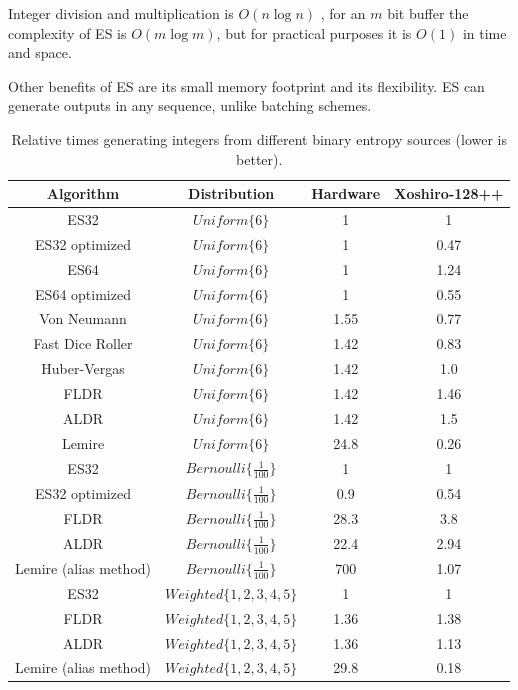 \documentclass[12pt]{article}
\begin{document}
Integer division and multiplication is $O(n \log n)$ \cite{harvey2021integer}, for an $m$ bit buffer the complexity of ES is $O(m \log m)$, but for practical purposes it is $O(1)$ in time and space.

Other benefits of ES are its small memory footprint and its flexibility. ES can generate outputs in any sequence, unlike batching schemes.

\begin{table}[h!]
\centering
\begin{tabular}{|c|c|c|c|}
\hline
Algorithm & Distribution & Hardware & Xoshiro-128++ \\
\hline
ES32                  & $Uniform\{6\}$ & 1 & 1 \\
ES32 optimized        & $Uniform\{6\}$ & 1 & 0.47 \\
ES64                  & $Uniform\{6\}$ & 1 & 1.24 \\
ES64 optimized        & $Uniform\{6\}$ & 1 & 0.55 \\
Von Neumann \cite{neumann51}     & $Uniform\{6\}$ & 1.55 & 0.77 \\
Fast Dice Roller \cite{lumbroso2013optimal} & $Uniform\{6\}$ & 1.42 & 0.83 \\
Huber-Vergas \cite{huber2024optimalrollingfairdice} & $Uniform\{6\}$ & 1.42 & 1.0 \\
FLDR \cite{saad2020fldr} & $Uniform\{6\}$ & 1.42 & 1.46 \\
ALDR \cite{saad2025} & $Uniform\{6\}$ & 1.42 & 1.5 \\
Lemire \cite{lemire2019fast} & $Uniform\{6\}$ & 24.8 & 0.26 \\
\hline

ES32                  & $Bernoulli\{\frac{1}{100}\}$ & 1 & 1 \\
ES32 optimized        & $Bernoulli\{\frac{1}{100}\}$ & 0.9 & 0.54 \\
FLDR                  & $Bernoulli\{\frac{1}{100}\}$ & 28.3 & 3.8 \\
ALDR                  & $Bernoulli\{\frac{1}{100}\}$ & 22.4 & 2.94 \\
Lemire (alias method) & $Bernoulli\{\frac{1}{100}\}$ & 700 & 1.07 \\

\hline

ES32                  & $Weighted\{1,2,3,4,5\}$ & 1 & 1 \\
FLDR                  & $Weighted\{1,2,3,4,5\}$ & 1.36 & 1.38 \\
ALDR                  & $Weighted\{1,2,3,4,5\}$ & 1.36 & 1.13 \\
Lemire (alias method) & $Weighted\{1,2,3,4,5\}$ & 29.8 & 0.18 \\

\hline

\end{tabular}
\caption{Relative times generating integers from different binary entropy sources (lower is better).}
    \label{tab:speed}
\end{table}
\end{document}
